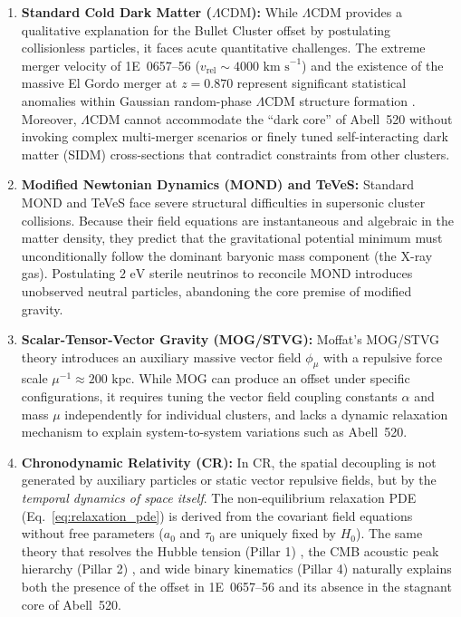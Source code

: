 \documentclass[aps,prd,reprint,superscriptaddress,nofootinbib,floatfix,amsmath,amssymb]{revtex4-2}
\begin{document}
\begin{enumerate}
    \item \textbf{Standard Cold Dark Matter ($\Lambda\text{CDM}$):} While $\Lambda\text{CDM}$ provides a qualitative explanation for the Bullet Cluster offset by postulating collisionless particles, it faces acute quantitative challenges. The extreme merger velocity of 1E~0657--56 ($v_{\text{rel}} \sim 4000\text{ km s}^{-1}$) and the existence of the massive El Gordo merger at $z = 0.870$ represent significant statistical anomalies within Gaussian random-phase $\Lambda\text{CDM}$ structure formation \cite{Menanteau2012_ElGordo}. Moreover, $\Lambda\text{CDM}$ cannot accommodate the ``dark core'' of Abell~520 without invoking complex multi-merger scenarios or finely tuned self-interacting dark matter (SIDM) cross-sections that contradict constraints from other clusters.
    
    \item \textbf{Modified Newtonian Dynamics (MOND) and TeVeS:} Standard MOND \cite{Milgrom1983} and TeVeS \cite{Bekenstein2004} face severe structural difficulties in supersonic cluster collisions. Because their field equations are instantaneous and algebraic in the matter density, they predict that the gravitational potential minimum must unconditionally follow the dominant baryonic mass component (the X-ray gas). Postulating $2\text{ eV}$ sterile neutrinos \cite{Angus2007} to reconcile MOND introduces unobserved neutral particles, abandoning the core premise of modified gravity.
    
    \item \textbf{Scalar-Tensor-Vector Gravity (MOG/STVG):} Moffat's MOG/STVG theory \cite{Moffat2006_MOG,BrownsteinMoffat2007} introduces an auxiliary massive vector field $\phi_\mu$ with a repulsive force scale $\mu^{-1} \approx 200\text{ kpc}$. While MOG can produce an offset under specific configurations, it requires tuning the vector field coupling constants $\alpha$ and mass $\mu$ independently for individual clusters, and lacks a dynamic relaxation mechanism to explain system-to-system variations such as Abell~520.
    
    \item \textbf{Chronodynamic Relativity (CR):} In CR, the spatial decoupling is not generated by auxiliary particles or static vector repulsive fields, but by the \textit{temporal dynamics of space itself}. The non-equilibrium relaxation PDE (Eq.~\eqref{eq:relaxation_pde}) is derived from the covariant field equations without free parameters ($a_0$ and $\tau_0$ are uniquely fixed by $H_0$). The same theory that resolves the Hubble tension (Pillar 1) \cite{Shreve2026_Expansion}, the CMB acoustic peak hierarchy (Pillar 2) \cite{Shreve2026_CMB}, and wide binary kinematics (Pillar 4) \cite{Shreve2026_WideBinaries} naturally explains both the presence of the offset in 1E~0657--56 and its absence in the stagnant core of Abell~520.
\end{enumerate}
\end{document}
